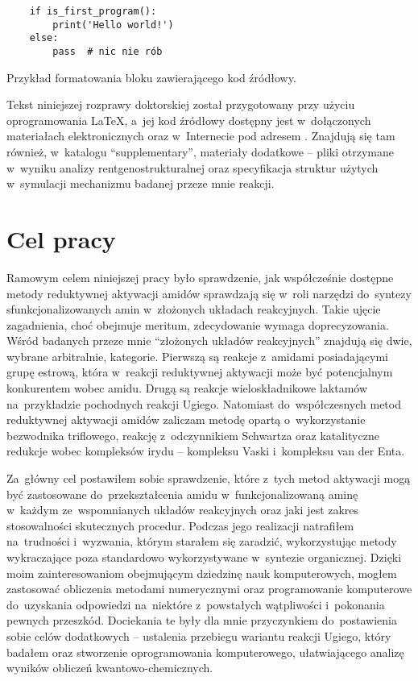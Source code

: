 \begin{listing}
  \begin{lstlisting}
    if is_first_program():
        print('Hello world!')
    else:
        pass  # nic nie rób
  \end{lstlisting}
\caption{Przykład formatowania bloku zawierającego kod źródłowy.}
\label{lst:example}
\end{listing}

Tekst niniejszej rozprawy doktorskiej został przygotowany przy użyciu oprogramowania \LaTeX,
  a~jej kod źródłowy dostępny jest w~dołączonych materiałach elektronicznych
  oraz w~Internecie pod adresem \repourl{}.
Znajdują się tam również, w~katalogu \enquote{supplementary}, materiały dodatkowe \---
  pliki  otrzymane w~wyniku analizy rentgenostrukturalnej oraz specyfikacja struktur
  użytych w~symulacji mechanizmu badanej przeze mnie reakcji.

\section{Cel pracy}\label{intro:goal}
Ramowym celem niniejszej pracy było sprawdzenie, jak współcześnie dostępne metody
  reduktywnej aktywacji amidów sprawdzają się w~roli narzędzi do~syntezy
  sfunkcjonalizowanych amin w~złożonych układach reakcyjnych.
Takie ujęcie zagadnienia, choć obejmuje meritum, zdecydowanie wymaga doprecyzowania.
Wśród badanych przeze mnie \enquote{złożonych układów reakcyjnych} znajdują się dwie,
  wybrane arbitralnie, kategorie.
Pierwszą są reakcje z~amidami posiadającymi grupę estrową, która w~reakcji reduktywnej aktywacji
  może być potencjalnym konkurentem wobec amidu.
Drugą są reakcje wieloskładnikowe laktamów na~przykładzie pochodnych reakcji Ugiego.
Natomiast do~współczesnych metod reduktywnej aktywacji amidów zaliczam metodę opartą
  o~wykorzystanie bezwodnika triflowego, reakcję z~odczynnikiem Schwartza oraz katalityczne
  redukcje wobec kompleksów irydu \--- kompleksu Vaski i~kompleksu van der Enta.

Za~główny cel postawiłem sobie sprawdzenie, które z~tych metod aktywacji mogą być zastosowane
  do~przekształcenia amidu w~funkcjonalizowaną aminę w~każdym ze~wspomnianych układów
  reakcyjnych oraz jaki jest zakres stosowalności skutecznych procedur.
Podczas jego realizacji natrafiłem na~trudności i~wyzwania, którym starałem się zaradzić,
  wykorzystując metody wykraczające poza standardowo wykorzystywane w~syntezie organicznej.
Dzięki moim zainteresowaniom obejmującym dziedzinę nauk komputerowych,
  mogłem zastosować obliczenia metodami numerycznymi oraz programowanie komputerowe
  do~uzyskania odpowiedzi na~niektóre z~powstałych wątpliwości i~pokonania pewnych przeszkód.
Dociekania te były dla mnie przyczynkiem do~postawienia sobie celów dodatkowych \---
  ustalenia przebiegu wariantu reakcji Ugiego, który badałem oraz stworzenie oprogramowania
  komputerowego, ułatwiającego analizę wyników obliczeń kwantowo-chemicznych.

